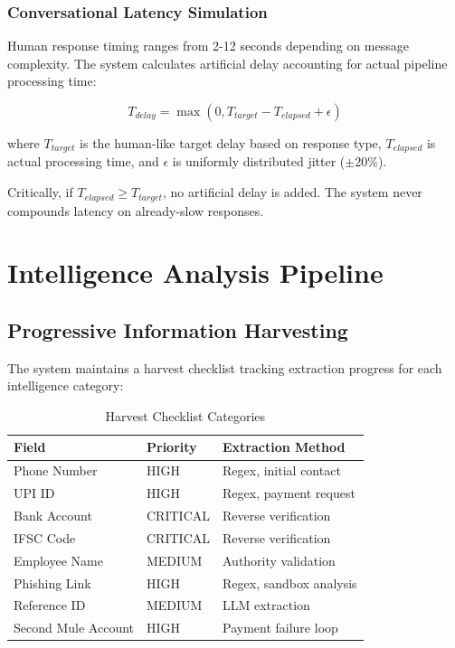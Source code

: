 \documentclass[conference]{IEEEtran}
\begin{document}
\subsubsection{Conversational Latency Simulation}

Human response timing ranges from 2-12 seconds depending on message complexity. The system calculates artificial delay accounting for actual pipeline processing time:

\begin{equation}
T_{delay} = \max(0, T_{target} - T_{elapsed} + \epsilon)
\end{equation}

where $T_{target}$ is the human-like target delay based on response type, $T_{elapsed}$ is actual processing time, and $\epsilon$ is uniformly distributed jitter ($\pm$20\%).

Critically, if $T_{elapsed} \geq T_{target}$, no artificial delay is added. The system never compounds latency on already-slow responses.

\section{Intelligence Analysis Pipeline}

\subsection{Progressive Information Harvesting}

The system maintains a harvest checklist tracking extraction progress for each intelligence category:

\begin{table}[htbp]
\caption{Harvest Checklist Categories}
\label{tab:harvest}
\begin{center}
\begin{tabular}{|l|l|l|}
\hline
\textbf{Field} & \textbf{Priority} & \textbf{Extraction Method} \\
\hline
Phone Number & HIGH & Regex, initial contact \\
\hline
UPI ID & HIGH & Regex, payment request \\
\hline
Bank Account & CRITICAL & Reverse verification \\
\hline
IFSC Code & CRITICAL & Reverse verification \\
\hline
Employee Name & MEDIUM & Authority validation \\
\hline
Phishing Link & HIGH & Regex, sandbox analysis \\
\hline
Reference ID & MEDIUM & LLM extraction \\
\hline
Second Mule Account & HIGH & Payment failure loop \\
\hline
\end{tabular}
\end{center}
\end{table}
\end{document}
